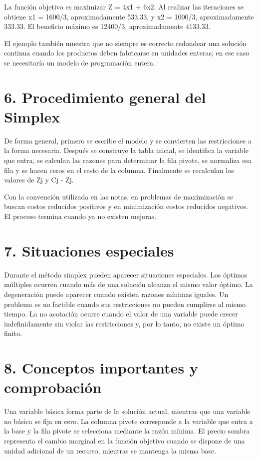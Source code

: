 \documentclass[12pt]{article}
\begin{document}
La función objetivo es maximizar Z = 4x1 + 6x2. Al realizar las iteraciones se obtiene x1 = 1600/3, aproximadamente 533.33, y x2 = 1000/3, aproximadamente 333.33. El beneficio máximo es 12400/3, aproximadamente 4133.33.

El ejemplo también muestra que no siempre es correcto redondear una solución continua cuando los productos deben fabricarse en unidades enteras; en ese caso se necesitaría un modelo de programación entera.

\section*{6. Procedimiento general del Simplex}
De forma general, primero se escribe el modelo y se convierten las restricciones a la forma necesaria. Después se construye la tabla inicial, se identifica la variable que entra, se calculan las razones para determinar la fila pivote, se normaliza esa fila y se hacen ceros en el resto de la columna. Finalmente se recalculan los valores de Zj y Cj - Zj.

Con la convención utilizada en las notas, en problemas de maximización se buscan costos reducidos positivos y en minimización costos reducidos negativos. El proceso termina cuando ya no existen mejoras.

\section*{7. Situaciones especiales}
Durante el método simplex pueden aparecer situaciones especiales. Los óptimos múltiples ocurren cuando más de una solución alcanza el mismo valor óptimo. La degeneración puede aparecer cuando existen razones mínimas iguales. Un problema es no factible cuando sus restricciones no pueden cumplirse al mismo tiempo. La no acotación ocurre cuando el valor de una variable puede crecer indefinidamente sin violar las restricciones y, por lo tanto, no existe un óptimo finito.

\section*{8. Conceptos importantes y comprobación}
Una variable básica forma parte de la solución actual, mientras que una variable no básica se fija en cero. La columna pivote corresponde a la variable que entra a la base y la fila pivote se selecciona mediante la razón mínima. El precio sombra representa el cambio marginal en la función objetivo cuando se dispone de una unidad adicional de un recurso, mientras se mantenga la misma base.
\end{document}
